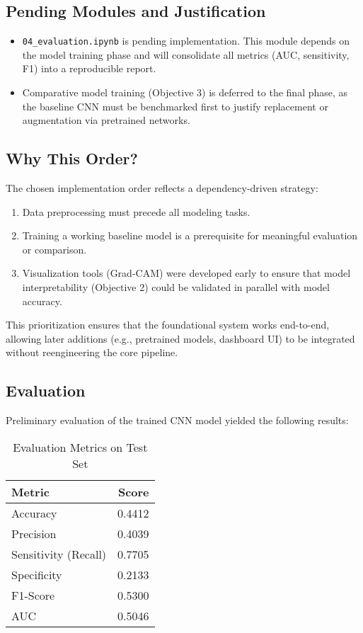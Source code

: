 \documentclass[12pt]{article}
\begin{document}
\subsection{Pending Modules and Justification}
\begin{itemize}
    \item \texttt{04\_evaluation.ipynb} is pending implementation. This module depends on the model training phase and will consolidate all metrics (AUC, sensitivity, F1) into a reproducible report.
    \item Comparative model training (Objective 3) is deferred to the final phase, as the baseline CNN must be benchmarked first to justify replacement or augmentation via pretrained networks.
\end{itemize}

\subsection{Why This Order?}
The chosen implementation order reflects a dependency-driven strategy:
\begin{enumerate}
    \item Data preprocessing must precede all modeling tasks.
    \item Training a working baseline model is a prerequisite for meaningful evaluation or comparison.
    \item Visualization tools (Grad-CAM) were developed early to ensure that model interpretability (Objective 2) could be validated in parallel with model accuracy.
\end{enumerate}

This prioritization ensures that the foundational system works end-to-end, allowing later additions (e.g., pretrained models, dashboard UI) to be integrated without reengineering the core pipeline.
\subsection{Evaluation}
Preliminary evaluation of the trained CNN model yielded the following results:

\begin{table}[H]
\centering
\caption{Evaluation Metrics on Test Set}
\begin{tabular}{lr}
\toprule
Metric & Score \\
\midrule
Accuracy & 0.4412 \\
Precision & 0.4039 \\
Sensitivity (Recall) & 0.7705 \\
Specificity & 0.2133 \\
F1-Score & 0.5300 \\
AUC & 0.5046 \\
\bottomrule
\end{tabular}
\end{table}
\end{document}
